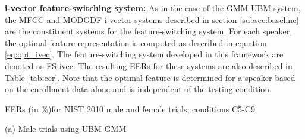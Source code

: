 \documentclass[preprint,12pt,5p]{elsarticle}
\begin{document}
\textbf{i-vector feature-switching system:}
As in the case of the GMM-UBM system, the MFCC and MODGDF i-vector systems
described in section \ref{subsec:baseline} are the constituent systems for the
feature-switching system. For each speaker, the optimal feature representation
is computed as described in equation \ref{eq:opt_ivec}. The feature-switching 
system developed in this framework are denoted as FS-ivec. 
The resulting EERs for these systems are also described in Table \ref{tab:eer}.
Note that the optimal feature is determined for a speaker based on the enrollment data
alone and is independent of the testing condition.

\begin{table*}
\centering
\caption{EERs (in \%)for NIST 2010 male and female trials, conditions C5-C9 }

\begin{minipage}{.5\linewidth}
\centering
{
\caption*{\small (a) Male trials using UBM-GMM}
\label{tab:eer_ubm_male}}
\end{minipage}%
\begin{minipage}{.5\linewidth}
\centering
\caption*{\small (b) Female trials using UBM-GMM}
\end{minipage}
\end{table*}
\end{document}
